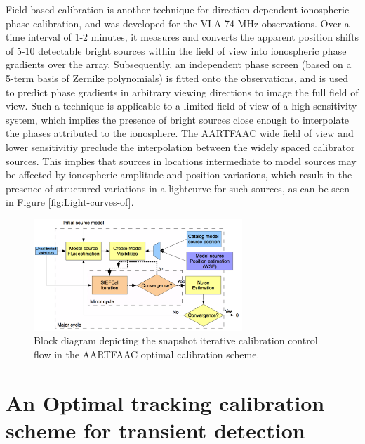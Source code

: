 \documentclass{aa}
\begin{document}
Field-based   calibration \citep{cottona2004beyond}  is  another   technique  for
direction dependent ionospheric phase calibration, and was developed for the VLA
74  MHz observations.  Over a  time  interval of  1-2 minutes,  it measures  and
converts the apparent  position shifts of 5-10 detectable  bright sources within
the field of view into ionospheric phase gradients over the array. Subsequently,
an independent phase screen (based on  a 5-term basis of Zernike polynomials) is
fitted  onto  the  observations, and  is  used  to  predict phase  gradients  in
arbitrary viewing directions to image the  full field of view.  Such a technique
is applicable  to a limited  field of view  of a high sensitivity  system, which
implies the  presence of bright sources  close enough to  interpolate the phases
attributed  to  the  ionosphere. The  AARTFAAC  wide  field  of view  and  lower
sensitivitiy  preclude the  interpolation between  the widely  spaced calibrator
sources.  This implies  that sources in locations intermediate  to model sources
may be affected  by ionospheric amplitude and position  variations, which result
in the  presence of structured variations  in a lightcurve for  such sources, as
can be seen in Figure \ref{fig:Light-curves-of}.

\begin{figure}[tbh]
\centering
\includegraphics[width=0.7\textwidth]{Figs/Fig2_blkdiag.png}
\caption{Block diagram depicting the snapshot
iterative calibration control flow in the AARTFAAC optimal calibration
scheme. }
\label{fig:Block-diagram-depicting}
\end{figure}

\section{\label{sec:An-Optimal,-tracking}An Optimal tracking calibration
scheme for transient detection}
\end{document}
